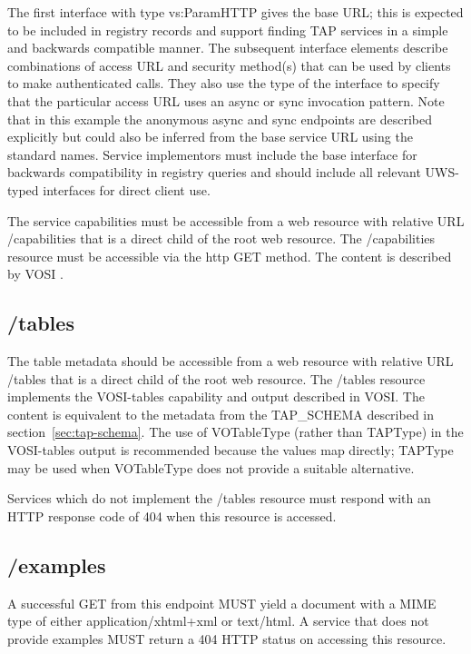\documentclass[11pt,letter]{ivoa}
\newcommand{\tapschema}{TAP\_SCHEMA}
\newcommand{\tapschema}{{%
  \relsize{-0.5}TAP\discretionary{-}{}{\kern-2pt\_}SCHEMA}}
\begin{document}
The first interface with type vs:ParamHTTP gives the base URL; this is expected to be 
included in registry records and support finding TAP services in a simple and backwards 
compatible manner. The subsequent interface elements describe combinations of access URL
and security method(s) that can be used by clients to make authenticated calls. They also 
use the type of the interface to specify that the particular access URL uses an async or sync 
invocation pattern. Note that in this example the anonymous async and sync endpoints are 
described explicitly but could also be inferred from the base service URL using the standard 
names. Service implementors must include the base interface for backwards compatibility in
registry queries and should include all relevant UWS-typed interfaces for direct client use.

The service capabilities must be accessible from a web resource with relative 
URL /capabilities that is a direct child of the root web resource. The 
/capabilities resource must be accessible via the http GET method. The content 
is described by VOSI \citep{std:VOSI11}.

\subsection{/tables}
\label{sec:vosi-tables}

The table metadata should be accessible from a web resource with relative URL 
/tables that is a direct child of the root web resource. The /tables resource 
implements the VOSI-tables capability and output described in VOSI.
The content is equivalent to the metadata from the 
\tapschema{} described in section~\ref{sec:tap-schema}. The use of VOTableType 
(rather than TAPType) in the VOSI-tables output  is recommended because the values 
map directly; TAPType may be used when VOTableType does not provide a suitable
alternative.

Services which do not implement the /tables resource must respond with an HTTP 
response code of 404 when this resource is accessed.

\subsection{/examples}
\label{sec:dali-examples}

A successful GET from this endpoint MUST yield a document with a MIME type of either 
application/xhtml+xml or text/html. A service that does not provide examples 
MUST return a 404 HTTP status on accessing this resource.
\end{document}
